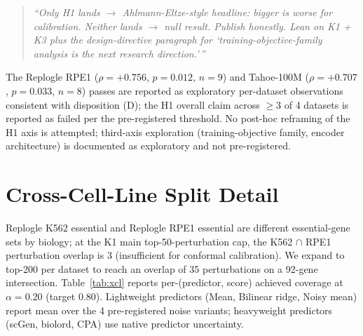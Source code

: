\documentclass{article}
\begin{document}
\begin{quote}
\textit{``Only H1 lands $\to$ Ahlmann-Eltze-style headline: bigger is worse for calibration. Neither lands $\to$ null result. Publish honestly. Lean on K1 + K3 plus the design-directive paragraph for `training-objective-family analysis is the next research direction.'\,''}
\end{quote}

The Replogle RPE1 ($\rho = +0.756$, $p = 0.012$, $n = 9$) and Tahoe-100M ($\rho = +0.707$, $p = 0.033$, $n = 8$) passes are reported as exploratory per-dataset observations consistent with disposition (D); the H1 overall claim across $\geq 3$ of 4 datasets is reported as failed per the pre-registered threshold. No post-hoc reframing of the H1 axis is attempted; third-axis exploration (training-objective family, encoder architecture) is documented as exploratory and not pre-registered.

\section{Cross-Cell-Line Split Detail}
\label{app:xcl}

Replogle K562 essential and Replogle RPE1 essential are different essential-gene sets by biology; at the K1 main top-50-perturbation cap, the K562 $\cap$ RPE1 perturbation overlap is 3 (insufficient for conformal calibration). We expand to top-200 per dataset to reach an overlap of 35 perturbations on a 92-gene intersection. Table~\ref{tab:xcl} reports per-(predictor, score) achieved coverage at $\alpha = 0.20$ (target $0.80$). Lightweight predictors (Mean, Bilinear ridge, Noisy mean) report mean over the 4 pre-registered noise variants; heavyweight predictors (scGen, biolord, CPA) use native predictor uncertainty.
\end{document}
